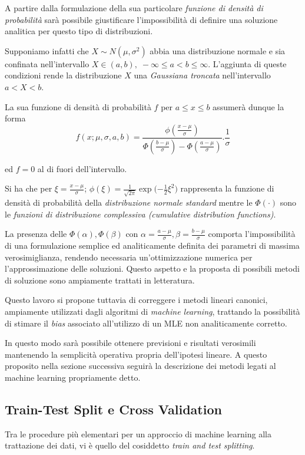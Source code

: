 \documentclass[12pt,openright,twoside,a4paper]{book}
\begin{document}
A partire dalla formulazione della sua particolare \textit{funzione di densità di probabilità} sarà possibile giustificare l'impossibilità di definire una soluzione analitica per questo tipo di distribuzioni.

Supponiamo infatti che  $X \sim N(\mu, \sigma^{2}) \!$ abbia una distribuzione normale e sia confinata nell'intervallo $ X \in (a,b), \; -\infty \leq a < b \leq \infty $.
L'aggiunta di queste  condizioni rende la distribuzione $X$ una \textit{Gaussiana troncata} nell'intervallo
$a<X<b$.

La sua funzione di densità di probabilità $f$ per $a\leq x \leq b$ assumerà dunque la forma
\begin{equation}
f(x;\mu,\sigma,a,b) = \frac{\phi(\frac{x - \mu}{\sigma})}{\Phi(\frac{b - \mu}{\sigma}) - \Phi(\frac{a - \mu}{\sigma}) }{.}\frac{1}{\sigma}
\end{equation}

ed $f=0$ al di fuori dell'intervallo.

Si ha che per $	\xi=\frac{x-\mu}{\sigma}$; ${\phi(\xi)=\frac{1}{\sqrt{2 \pi}}\exp{(-\frac{1}{2}\xi^2})} $ rappresenta la funzione di densità di probabilità della \textit{distribuzione normale standard} mentre le ${\Phi(\cdot)}$ sono le \textit{funzioni di distribuzione complessiva (cumulative distribution functions)}. \cite{TGMLE}

La presenza delle $\Phi(\alpha),\Phi(\beta)$ con $\alpha=\frac{a-\mu}{\sigma}, \beta=\frac{b-\mu} {\sigma}$ comporta l'impossibilità di una formulazione semplice ed analiticamente definita dei parametri di massima verosimiglianza, rendendo necessaria un'ottimizzazione numerica per l'approssimazione delle soluzioni.
Questo aspetto e la proposta di possibili metodi di soluzione sono ampiamente trattati in letteratura. \cite{econ}

Questo lavoro si propone tuttavia di correggere i metodi lineari canonici, ampiamente utilizzati dagli algoritmi di \textit{machine learning}, trattando la possibilità di stimare il \textit{bias} associato all'utilizzo di un MLE non analiticamente corretto.

In questo modo sarà possibile ottenere previsioni e risultati verosimili mantenendo la semplicità operativa propria dell'ipotesi lineare.
A questo proposito nella sezione successiva seguirà la descrizione dei metodi legati al machine learning propriamente detto.

\subsection{Train-Test Split e Cross Validation}
Tra le procedure più elementari per un approccio di machine learning alla trattazione dei dati, vi è quello del cosiddetto \textit{train and test splitting}.
\end{document}
